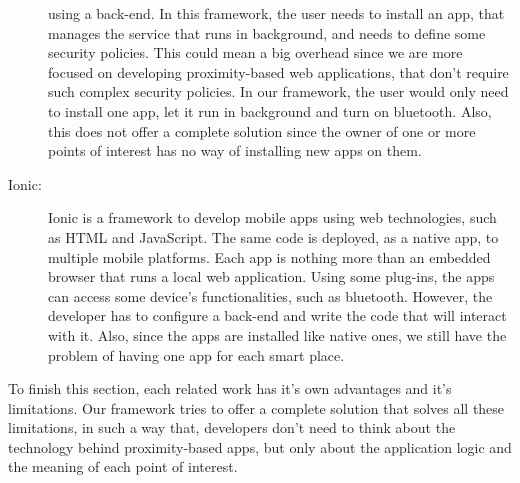 \begin{description}
  using a back-end. In this framework,
  the user needs to install an app, that manages the service
  that runs in background, and needs to define some
  security policies. This could mean a big overhead since
  we are more focused on developing proximity-based
  web applications, that don't require such complex security
  policies. In our framework, the user would only need to
  install one app, let it run in background and turn on
  bluetooth. Also, this does not offer a complete solution
  since the owner of one or more points of interest
  has no way of installing new apps on them.
  \item[Ionic:] Ionic is a framework to develop mobile apps
  using web technologies, such as HTML and JavaScript. The
  same code is deployed, as a native app, to multiple mobile
  platforms. Each app is nothing more than an embedded browser
  that runs a local web application. 
  Using some plug-ins, the apps can access some
  device's functionalities, such as bluetooth. However,
  the developer has to configure a back-end and write the
  code that will interact with it. Also, since the apps are
  installed like native ones, we still have the problem of
  having one app for each smart place.
\end{description}
To finish this section, each related work has it's own
advantages and it's limitations. Our framework tries 
to offer a complete solution that solves all
these limitations, in such a way that, developers don't
need to think about the technology behind proximity-based
apps, but only about the application logic and the meaning
of each point of interest.
